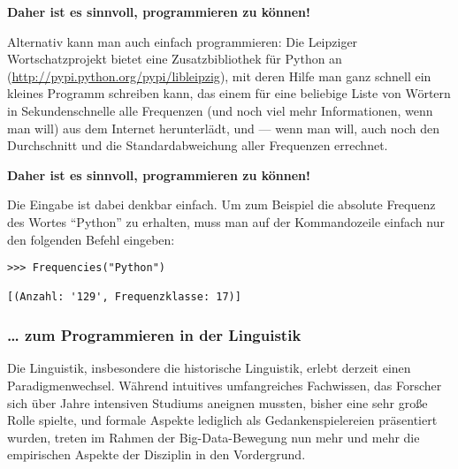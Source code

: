 \vspace{0.5cm}\par\noindent\textbf{Daher ist es sinnvoll, programmieren zu können!}\vspace{0.5cm}

Alternativ kann man auch einfach programmieren: Die Leipziger
Wortschatzprojekt bietet eine Zusatzbibliothek für Python an
(\url{http://pypi.python.org/pypi/libleipzig}), mit deren Hilfe man ganz
schnell ein kleines Programm schreiben kann, das einem für eine
beliebige Liste von Wörtern in Sekundenschnelle alle Frequenzen (und
noch viel mehr Informationen, wenn man will) aus dem Internet
herunterlädt, und --- wenn man will, auch noch den Durchschnitt und die
Standardabweichung aller Frequenzen errechnet.



\vspace{0.5cm}\par\noindent\textbf{Daher ist es sinnvoll, programmieren zu können!}\vspace{0.5cm}

Die Eingabe ist dabei denkbar einfach. Um zum Beispiel die absolute
Frequenz des Wortes ``Python'' zu erhalten, muss man auf der
Kommandozeile einfach nur den folgenden Befehl eingeben:

\begin{verbatim}
>>> Frequencies("Python")

[(Anzahl: '129', Frequenzklasse: 17)]
\end{verbatim}


\subsubsection{\texorpdfstring{{\ldots{} zum Programmieren in der
Linguistik}}{\ldots{} zum Programmieren in der Linguistik}}

{ Die Linguistik, insbesondere die historische Linguistik, erlebt
derzeit einen Paradigmenwechsel. Während intuitives umfangreiches
Fachwissen, das Forscher sich über Jahre intensiven Studiums aneignen
mussten, bisher eine sehr große Rolle spielte, und formale Aspekte
lediglich als Gedankenspielereien präsentiert wurden, treten im Rahmen
der Big-Data-Bewegung nun mehr und mehr die empirischen Aspekte der
Disziplin in den Vordergrund. }



